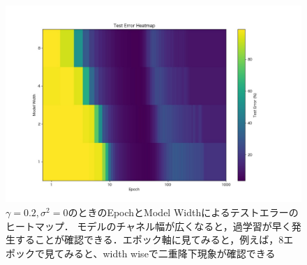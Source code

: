 \begin{figure}[H]
    \centering
    \includegraphics[width=\linewidth]{fig/test_error_heatmap_ln0.2.pdf}
    \caption[$\gamma = 0.2, \sigma^2 = 0$のときのEpochとModel Widthによるテストエラーのヒートマップ]{$\gamma = 0.2, \sigma^2 = 0$のときのEpochとModel Widthによるテストエラーのヒートマップ．
    モデルのチャネル幅が広くなると，過学習が早く発生することが確認できる．エポック軸に見てみると，例えば，8エポックで見てみると、width wiseで二重降下現象が確認できる}
    \label{fig:modelwidth_heatmap}
\end{figure}
